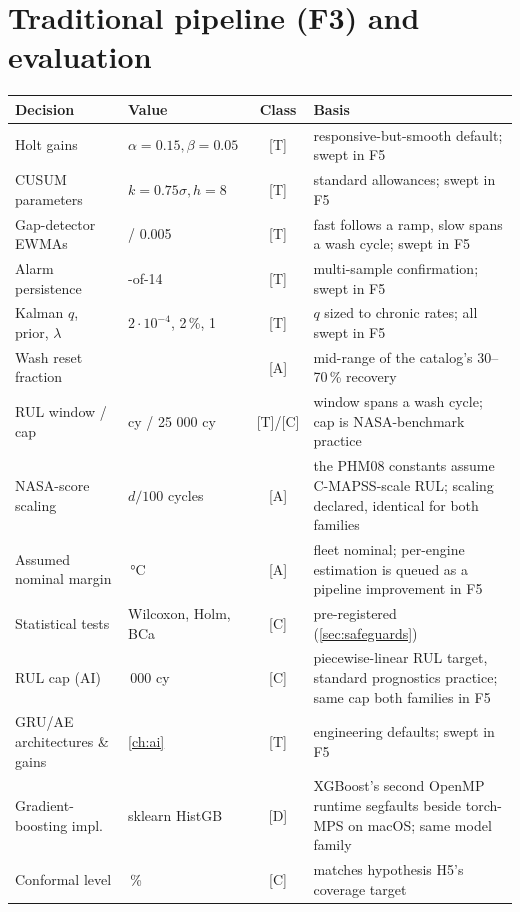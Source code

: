 \section*{Traditional pipeline (F3) and evaluation}

\begin{center}\footnotesize\setlength{\tabcolsep}{4pt}
\begin{tabular}{>{\raggedright\arraybackslash}p{}>{\raggedright\arraybackslash}p{}c>{\raggedright\arraybackslash}p{}}
  \toprule
  Decision & Value & Class & Basis \\
  \midrule
  Holt gains & $\alpha{=}0.15, \beta{=}0.05$ & [T] & responsive-but-smooth default; swept in F5 \\
  CUSUM parameters & $k{=}0.75\sigma, h{=}8$ & [T] & standard allowances; swept in F5 \\
  Gap-detector EWMAs & 0.1 / 0.005 & [T] & fast follows a ramp, slow spans a wash cycle; swept in F5 \\
  Alarm persistence & 10-of-14 & [T] & multi-sample confirmation; swept in F5 \\
  Kalman $q$, prior, $\lambda$ & $2{\cdot}10^{-4}$, 2\,\%, 1 & [T] & $q$ sized to chronic
    rates; all swept in F5 \\
  Wash reset fraction & 0.5 & [A] & mid-range of the catalog's 30--70\,\% recovery \\
  RUL window / cap & 1500 cy / 25 000 cy & [T]/[C] & window spans a wash cycle; cap is
    NASA-benchmark practice \\
  NASA-score scaling & $d/100$ cycles & [A] & the PHM08 constants assume C-MAPSS-scale RUL;
    scaling declared, identical for both families \\
  Assumed nominal margin & 85\,°C & [A] & fleet nominal; per-engine estimation is queued as a
    pipeline improvement in F5 \\
  Statistical tests & Wilcoxon, Holm, BCa & [C] & pre-registered (\cref{sec:safeguards}) \\
  RUL cap (AI) & 12\,000 cy & [C] & piecewise-linear RUL target, standard prognostics practice; same cap both families in F5 \\
  GRU/AE architectures \& gains & \cref{ch:ai} & [T] & engineering defaults; swept in F5 \\
  Gradient-boosting impl. & sklearn HistGB & [D] & XGBoost's second OpenMP runtime segfaults beside torch-MPS on macOS; same model family \\
  Conformal level & 90\,\% & [C] & matches hypothesis H5's coverage target \\

\end{tabular}
\end{center}
